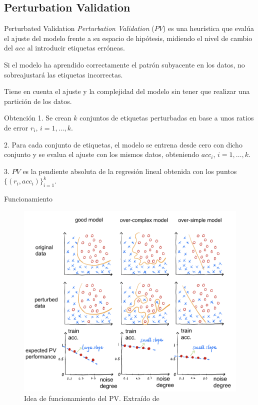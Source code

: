 \documentclass[spanish]{beamer}
\begin{document}
\subsection{Perturbation Validation}

\begin{frame}{Perturbated Validation}
  \emph{Perturbation Validation} ($PV$) es una heurística que evalúa el ajuste del modelo frente a su espacio de hipótesis, midiendo el nivel de cambio del $acc$ al introducir etiquetas erróneas.

  \pause

  Si el modelo ha aprendido correctamente el patrón subyacente en los datos, no sobreajustará las etiquetas incorrectas.

  \pause

  Tiene en cuenta el ajuste y la complejidad del modelo sin tener que realizar una partición de los datos.
\end{frame}


\begin{frame}{Obtención}
  1. Se crean $k$ conjuntos de etiquetas perturbadas en base a unos ratios de error $r_i, \, i = 1, \ldots, k$.
  \pause

  2. Para cada conjunto de etiquetas, el modelo se entrena desde cero con dicho conjunto y se evalua el ajuste con los mismos datos, obteniendo $acc_i, \, i = 1, \ldots, k$.
  \pause

  3. $PV$ es la pendiente absoluta de la regresión lineal obtenida con los puntos $\{(r_i, acc_i)\}_{i = 1}^k$.
\end{frame}

\begin{frame}{Funcionamiento}
  \begin{figure}
    \centering
    \includegraphics[width=.6\textwidth]{img/idea-pv}
    \caption{Idea de funcionamiento del PV. Extraído de \cite{pv}}
  \end{figure}
\end{frame}
\end{document}
